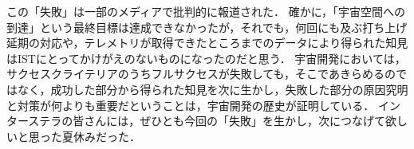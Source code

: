 この「失敗」は一部のメディアで批判的に報道された．
確かに，「宇宙空間への到達」という最終目標は達成できなかったが，それでも，何回にも及ぶ打ち上げ延期の対応や，テレメトリが取得できたところまでのデータにより得られた知見はISTにとってかけがえのないものになったのだと思う．
宇宙開発においては，サクセスクライテリアのうちフルサクセスが失敗しても，そこであきらめるのではなく，成功した部分から得られた知見を次に生かし，失敗した部分の原因究明と対策が何よりも重要だということは，宇宙開発の歴史が証明している．
インターステラの皆さんには，ぜひとも今回の「失敗」を生かし，次につなげて欲しいと思った夏休みだった．


